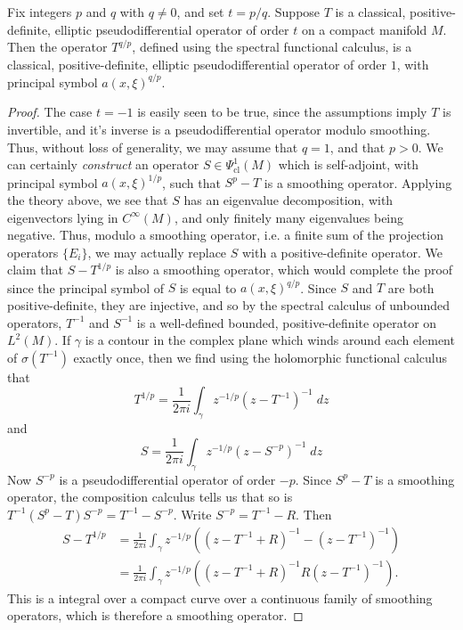 \begin{theorem}
    Fix integers $p$ and $q$ with $q \neq 0$, and set $t = p/q$. Suppose $T$ is a classical, positive-definite, elliptic pseudodifferential operator of order $t$ on a compact manifold $M$. Then the operator $T^{q/p}$, defined using the spectral functional calculus, is a classical, positive-definite, elliptic pseudodifferential operator of order $1$, with principal symbol $a(x,\xi)^{q/p}$.
\end{theorem}
\begin{proof}
    The case $t = -1$ is easily seen to be true, since the assumptions imply $T$ is invertible, and it's inverse is a pseudodifferential operator modulo smoothing. Thus, without loss of generality, we may assume that $q = 1$, and that $p > 0$. We can certainly \emph{construct} an operator $S \in \Psi^1_{\text{cl}}(M)$ which is self-adjoint, with principal symbol $a(x,\xi)^{1/p}$, such that $S^p - T$ is a smoothing operator. Applying the theory above, we see that $S$ has an eigenvalue decomposition, with eigenvectors lying in $C^\infty(M)$, and only finitely many eigenvalues being negative. Thus, modulo a smoothing operator, i.e. a finite sum of the projection operators $\{ E_i \}$, we may actually replace $S$ with a positive-definite operator. We claim that $S - T^{1/p}$ is also a smoothing operator, which would complete the proof since the principal symbol of $S$ is equal to $a(x,\xi)^{q/p}$. Since $S$ and $T$ are both positive-definite, they are injective, and so by the spectral calculus of unbounded operators, $T^{-1}$ and $S^{-1}$ is a well-defined bounded, positive-definite operator on $L^2(M)$. If $\gamma$ is a contour in the complex plane which winds around each element of $\sigma(T^{-1})$ exactly once, then we find using the holomorphic functional calculus that
    \[ T^{1/p} = \frac{1}{2\pi i} \int_\gamma z^{-1/p} (z - T^{-1})^{-1}\; dz \]
    and
    \[ S = \frac{1}{2 \pi i} \int_\gamma z^{-1/p} (z - S^{-p})^{-1}\; dz \]
    Now $S^{-p}$ is a pseudodifferential operator of order $-p$. Since $S^p - T$ is a smoothing operator, the composition calculus tells us that so is $T^{-1} (S^p - T) S^{-p} = T^{-1} - S^{-p}$. Write $S^{-p} = T^{-1} - R$. Then
    \begin{align*}
        S - T^{1/p} &= \frac{1}{2 \pi i} \int_\gamma z^{-1/p} \left( (z - T^{-1} + R)^{-1} - (z - T^{-1})^{-1} \right)\\
        &= \frac{1}{2 \pi i} \int_\gamma z^{-1/p} \left( (z - T^{-1} + R)^{-1} R (z - T^{-1})^{-1} \right).
    \end{align*}
    This is a integral over a compact curve over a continuous family of smoothing operators, which is therefore a smoothing operator.
\end{proof}

